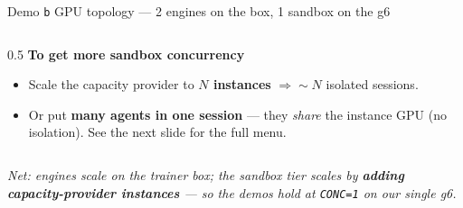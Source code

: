 \documentclass[aspectratio=169]{beamer}
\begin{document}
\begin{frame}{Demo \texttt{b} GPU topology --- 2 engines on the box, 1 sandbox on the g6}
\begin{columns}[T]
\begin{column}{0.5\textwidth}
    \textbf{To get more sandbox concurrency}
    \begin{itemize}\scriptsize
      \item Scale the capacity provider to \textbf{$N$ instances} $\Rightarrow \sim N$ isolated sessions.
      \item Or put \textbf{many agents in one session} --- they \emph{share} the instance GPU (no
        isolation). See the next slide for the full menu.
    \end{itemize}
  \end{column}
  \end{columns}
  \vspace{0.1em}
  {\footnotesize\itshape Net: engines scale on the trainer box; the sandbox tier scales by
  \textbf{adding capacity-provider instances} --- so the demos hold at \texttt{CONC=1} on our single g6.}
\end{frame}
\end{document}

